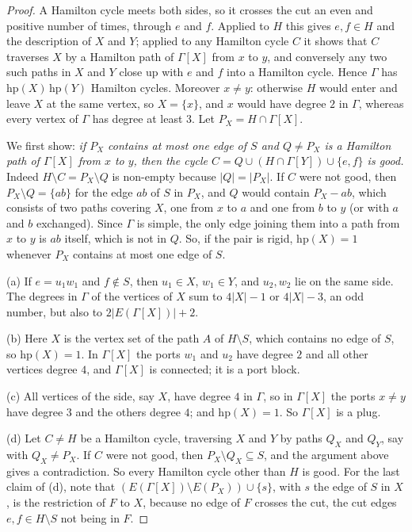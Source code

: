 \documentclass[11pt,a4paper]{article}
\theoremstyle{definition}
\theoremstyle{remark}
\begin{document}
\begin{proof}
A Hamilton cycle meets both sides, so it crosses the cut an even and positive number of times, through $e$ and $f$. Applied to $H$ this gives $e,f\in H$ and the description of $X$ and $Y$; applied to any Hamilton cycle $C$ it shows that $C$ traverses $X$ by a Hamilton path of $\Gamma[X]$ from $x$ to $y$, and conversely any two such paths in $X$ and $Y$ close up with $e$ and $f$ into a Hamilton cycle. Hence $\Gamma$ has $\mathrm{hp}(X)\,\mathrm{hp}(Y)$ Hamilton cycles. Moreover $x\ne y$: otherwise $H$ would enter and leave $X$ at the same vertex, so $X=\{x\}$, and $x$ would have degree $2$ in $\Gamma$, whereas every vertex of $\Gamma$ has degree at least $3$. Let $P_X=H\cap\Gamma[X]$.

We first show: \emph{if $P_X$ contains at most one edge of $S$ and $Q\ne P_X$ is a Hamilton path of $\Gamma[X]$ from $x$ to $y$, then the cycle $C=Q\cup(H\cap\Gamma[Y])\cup\{e,f\}$ is good.} Indeed $H\setminus C=P_X\setminus Q$ is non-empty because $|Q|=|P_X|$. If $C$ were not good, then $P_X\setminus Q=\{ab\}$ for the edge $ab$ of $S$ in $P_X$, and $Q$ would contain $P_X-ab$, which consists of two paths covering $X$, one from $x$ to $a$ and one from $b$ to $y$ (or with $a$ and $b$ exchanged). Since $\Gamma$ is simple, the only edge joining them into a path from $x$ to $y$ is $ab$ itself, which is not in $Q$. So, if the pair is rigid, $\mathrm{hp}(X)=1$ whenever $P_X$ contains at most one edge of $S$.

(a) If $e=u_1w_1$ and $f\notin S$, then $u_1\in X$, $w_1\in Y$, and $u_2,w_2$ lie on the same side. The degrees in $\Gamma$ of the vertices of $X$ sum to $4|X|-1$ or $4|X|-3$, an odd number, but also to $2|E(\Gamma[X])|+2$.

(b) Here $X$ is the vertex set of the path $A$ of $H\setminus S$, which contains no edge of $S$, so $\mathrm{hp}(X)=1$. In $\Gamma[X]$ the ports $w_1$ and $u_2$ have degree $2$ and all other vertices degree $4$, and $\Gamma[X]$ is connected; it is a port block.

(c) All vertices of the side, say $X$, have degree $4$ in $\Gamma$, so in $\Gamma[X]$ the ports $x\ne y$ have degree $3$ and the others degree $4$; and $\mathrm{hp}(X)=1$. So $\Gamma[X]$ is a plug.

(d) Let $C\ne H$ be a Hamilton cycle, traversing $X$ and $Y$ by paths $Q_X$ and $Q_Y$, say with $Q_X\ne P_X$. If $C$ were not good, then $P_X\setminus Q_X\subseteq S$, and the argument above gives a contradiction. So every Hamilton cycle other than $H$ is good. For the last claim of (d), note that $(E(\Gamma[X])\setminus E(P_X))\cup\{s\}$, with $s$ the edge of $S$ in $X$, is the restriction of $F$ to $X$, because no edge of $F$ crosses the cut, the cut edges $e,f\in H\setminus S$ not being in $F$.


\end{proof}
\end{document}
